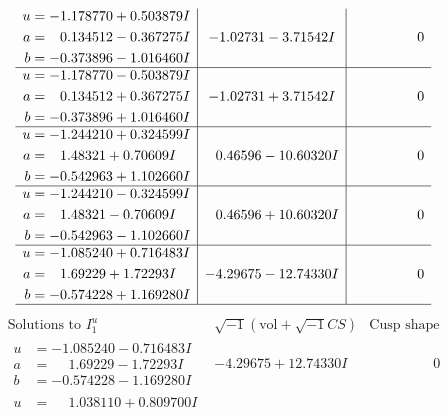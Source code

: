 \documentclass[1p]{elsarticle_modified}
\theoremstyle{definition}
\newcommand{\I}{\sqrt{-1}}
\begin{document}
$$\begin{array}{c|c|c}
\begin{aligned}
u &= -1.178770 + 0.503879 I \\
a &= \phantom{-}0.134512 - 0.367275 I \\
b &= -0.373896 - 1.016460 I\end{aligned}
 & -1.02731 - 3.71542 I & \phantom{-0.000000 } 0 \\ \hline\begin{aligned}
u &= -1.178770 - 0.503879 I \\
a &= \phantom{-}0.134512 + 0.367275 I \\
b &= -0.373896 + 1.016460 I\end{aligned}
 & -1.02731 + 3.71542 I & \phantom{-0.000000 } 0 \\ \hline\begin{aligned}
u &= -1.244210 + 0.324599 I \\
a &= \phantom{-}1.48321 + 0.70609 I \\
b &= -0.542963 + 1.102660 I\end{aligned}
 & \phantom{-}0.46596 - 10.60320 I & \phantom{-0.000000 } 0 \\ \hline\begin{aligned}
u &= -1.244210 - 0.324599 I \\
a &= \phantom{-}1.48321 - 0.70609 I \\
b &= -0.542963 - 1.102660 I\end{aligned}
 & \phantom{-}0.46596 + 10.60320 I & \phantom{-0.000000 } 0 \\ \hline\begin{aligned}
u &= -1.085240 + 0.716483 I \\
a &= \phantom{-}1.69229 + 1.72293 I \\
b &= -0.574228 + 1.169280 I\end{aligned}
 & -4.29675 - 12.74330 I & \phantom{-0.000000 } 0\\
 \hline 
 \end{array}$$\newpage$$\begin{array}{c|c|c}  
\text{Solutions to }I^u_{1}& \I (\text{vol} + \sqrt{-1}CS) & \text{Cusp shape}\\
 \hline 
\begin{aligned}
u &= -1.085240 - 0.716483 I \\
a &= \phantom{-}1.69229 - 1.72293 I \\
b &= -0.574228 - 1.169280 I\end{aligned}
 & -4.29675 + 12.74330 I & \phantom{-0.000000 } 0 \\ \hline\begin{aligned}
u &= \phantom{-}1.038110 + 0.809700 I \\

\end{aligned}
\end{array}$$
\end{document}
